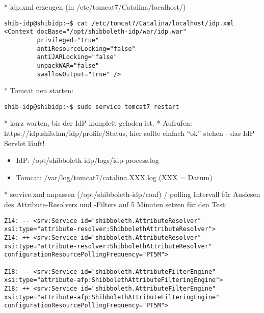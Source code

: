 * idp.xml erzeugen (in /etc/tomcat7/Catalina/localhost/)
\begin{lstlisting}
shib-idp@shibidp:~$ cat /etc/tomcat7/Catalina/localhost/idp.xml
<Context docBase="/opt/shibboleth-idp/war/idp.war"
		 privileged="true"
		 antiResourceLocking="false"
		 antiJARLocking="false"
		 unpackWAR="false"
		 swallowOutput="true" />
\end{lstlisting}
* Tomcat neu starten:
\begin{lstlisting}
shib-idp@shibidp:~$ sudo service tomcat7 restart
\end{lstlisting}
* kurz warten, bis der IdP komplett geladen ist.
* Aufrufen: https://idp.shib.lan/idp/profile/Status, hier sollte einfach
"`ok"' stehen - das IdP Servlet läuft!
\begin{itemize}
  \item IdP: /opt/shibboleth-idp/logs/idp-process.log
  \item Tomcat: /var/log/tomcat7/catalina.XXX.log (XXX = Datum)
\end{itemize}
* service.xml anpassen (/opt/shibboleth-idp/conf) / polling Intervall für Auslesen des Attribute-Resolvers und -Filters auf 5 Minuten setzen für den Test:
\begin{lstlisting}
Z14: -- <srv:Service id="shibboleth.AttributeResolver" xsi:type="attribute-resolver:ShibbolethAttributeResolver">
Z14: ++ <srv:Service id="shibboleth.AttributeResolver" xsi:type="attribute-resolver:ShibbolethAttributeResolver" configurationResourcePollingFrequency="PT5M">

Z18: -- <srv:Service id="shibboleth.AttributeFilterEngine" xsi:type="attribute-afp:ShibbolethAttributeFilteringEngine">
Z18: ++ <srv:Service id="shibboleth.AttributeFilterEngine" xsi:type="attribute-afp:ShibbolethAttributeFilteringEngine" configurationResourcePollingFrequency="PT5M">
\end{lstlisting}

